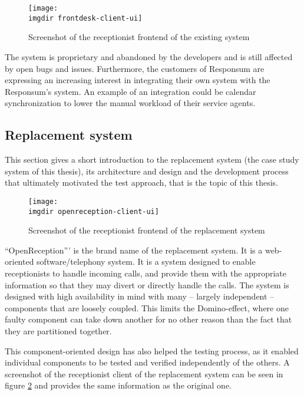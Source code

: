 \begin{figure}[!hbpt]
\centering
\texttt{[image: \\imgdir frontdesk-client-ui]}
\caption{Screenshot of the receptionist frontend of the existing system}
\label{fig:frontdesk-client-ui}
\end{figure}

\noindent The system is proprietary and abandoned by the developers and is still affected by open bugs and issues. Furthermore, the customers of Responsum are expressing an increasing interest in integrating their own system with the Responsum's system. An example of an integration could be calendar synchronization to lower the manual workload of their service agents.

\subsection{Replacement system}
This section gives a short introduction to the replacement system (the case study system of this thesis), its architecture and design and the development process that ultimately motivated the test approach, that is the topic of this thesis.\medskip
\begin{figure}[!hbpt]
\centering
\texttt{[image: \\imgdir openreception-client-ui]}
\caption{Screenshot of the receptionist frontend of the replacement system}
\label{fig:openreception-client-ui}
\end{figure}
\noindent ``OpenReception''' is the brand name of the replacement system. It is a web-oriented software/telephony system. It is a system designed to enable receptionists to handle incoming calls, and provide them with the appropriate information so that they may divert or directly handle the calls. The system is designed with high availability in mind with many -- largely independent -- components that are loosely coupled. This limits the Domino-effect, where one faulty component can take down another for no other reason than the fact that they are partitioned together.\medskip

\noindent This component-oriented design has also helped the testing process, as it enabled individual components to be tested and verified independently of the others. A screenshot of the receptionist client of the replacement system can be seen in figure \ref{fig:openreception-client-ui} and provides the same information as the original one.


